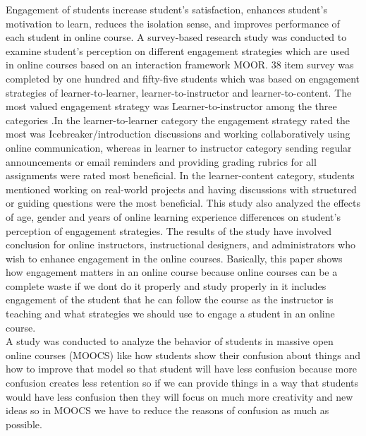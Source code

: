 Engagement of students increase student's satisfaction, enhances student's motivation to learn, reduces the isolation sense, and improves performance of each student in online course. A survey-based research study was conducted to examine student's perception on different engagement strategies which are used in online courses based on  an interaction framework MOOR. 38 item survey was completed by one hundred and fifty-five students which was based on engagement strategies of learner-to-learner, learner-to-instructor and learner-to-content. The most valued engagement strategy was Learner-to-instructor among the three categories .In the learner-to-learner category the engagement strategy rated the most was Icebreaker/introduction discussions and working collaboratively using online communication, whereas in learner to instructor category sending regular announcements or email reminders and providing grading rubrics for all assignments were rated most beneficial. In the learner-content category, students mentioned working on real-world projects and having discussions with structured or guiding questions were the most beneficial. This study also analyzed the effects of age, gender and years of online learning experience differences on student's perception of engagement strategies. The results of the study have involved conclusion for online instructors, instructional designers, and administrators who wish to enhance engagement in the online courses. Basically, this paper shows how engagement matters in an online course because online courses can be a complete waste if we dont do it properly and study properly in it includes engagement of the student that he can follow the course as the instructor is teaching and what strategies we should use to engage a student in an online course. \cite{Martin2018(2)}\\
A study was conducted to analyze the behavior of students in massive open online courses (MOOCS) like how students show their confusion about things and how to improve that model so that student will have less confusion because more confusion creates less retention so if we can provide things in a way that students would have less confusion then they will focus on much more creativity and new ideas so in MOOCS we have to reduce the reasons of confusion as much as possible.\cite{Yang2016}\\




 

